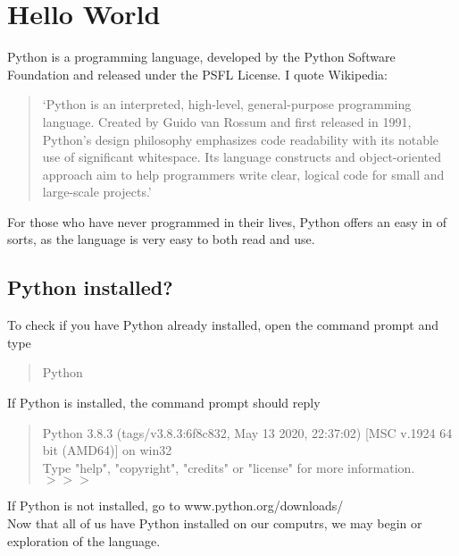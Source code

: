 \chapter{Hello World}
Python is a programming language, developed by the Python Software Foundation and released under the PSFL License. I quote Wikipedia: \begin{quotation}
`Python is an interpreted, high-level, general-purpose programming language. Created by Guido van Rossum and first released in 1991, Python's design philosophy emphasizes code readability with its notable use of significant whitespace. Its language constructs and object-oriented approach aim to help programmers write clear, logical code for small and large-scale projects.'
\end{quotation}
For those who have never programmed in their lives, Python offers an easy in of sorts, as the language is very easy to both read and use.
\section{Python installed?}
To check if you have Python already installed, open the command prompt and type \begin{quote}
Python
\end{quote}
If Python is installed, the command prompt should reply
\begin{quote}
Python 3.8.3 (tags/v3.8.3:6f8c832, May 13 2020, 22:37:02) [MSC v.1924 64 bit (AMD64)] on win32\\
Type "help", "copyright", "credits" or "license" for more information.\\
$>>>$
\end{quote}
If Python is not installed, go to www.python.org/downloads/\\
Now that all of us have Python installed on our computrs, we may begin or exploration of the language.
